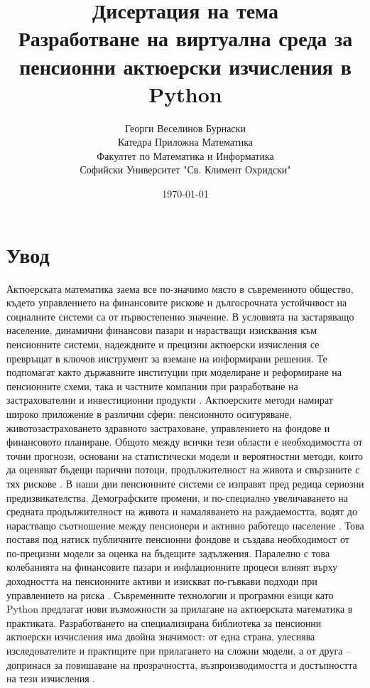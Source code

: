 \documentclass[a4paper,12pt]{article}
\title{\textbf{Дисертация на тема
        \\[0.5em] \large{Разработване на виртуална среда за пенсионни актюерски изчисления в Python}}}
\author{Георги Веселинов Бурнаски
        \\ Катедра Приложна Математика
        \\ Факултет по Математика и Информатика
        \\ Софийски Университет "Св. Климент Охридски"}
\date{\today}
\begin{document}
\maketitle
\newpage
\section{Увод}
Актюерската математика заема все по-значимо място в съвременното общество, където управлението на финансовите рискове и дългосрочната устойчивост на социалните системи са от първостепенно значение.
\newline
\newline
В условията на застаряващо население, динамични финансови пазари и нарастващи изисквания към пенсионните системи, надеждните и прецизни актюерски изчисления се превръщат в ключов инструмент за вземане на информирани решения. Те подпомагат както държавните институции при моделиране и реформиране на пенсионните схеми, така и частните компании при разработване на застрахователни и инвестиционни продукти \cite{dalriada2023}.
\newline
\newline
Актюерските методи намират широко приложение в различни сфери: пенсионното осигуряване, животозастраховането здравното застраховане, управлението на фондове и финансовото планиране. Общото между всички тези области е необходимостта от точни прогнози, основани на статистически модели и вероятностни методи, които да оценяват бъдещи парични потоци, продължителност на живота и свързаните с тях рискове \cite{milliman2022}.
\newline
\newline
В наши дни пенсионните системи се изправят пред редица сериозни предизвикателства. Демографските промени, и по-специално увеличаването на средната продължителност на живота и намаляването на раждаемостта, водят до нарастващо съотношение между пенсионери и
активно работещо население \cite{bostonfed1999}. Това поставя под натиск публичните пенсионни фондове и създава необходимост от по-прецизни модели за оценка на бъдещите задължения. Паралелно с това колебанията на финансовите пазари и инфлационните процеси влияят върху доходността на пенсионните активи и изискват по-гъвкави подходи при управлението на риска \cite{ncpers2023}.
\newline
\newline
Съвременните технологии и програмни езици като Python предлагат нови възможности за прилагане на актюерската математика в практиката. Разработването на специализирана библиотека за пенсионни актюерски изчисления има двойна значимост: от една страна, улеснява изследователите и практиците при прилагането на сложни модели, а от друга – допринася за повишаване на прозрачността, възпроизводимостта и достъпността на тези изчисления \cite{lifelib2024, hyperexponential2023}.
\end{document}
